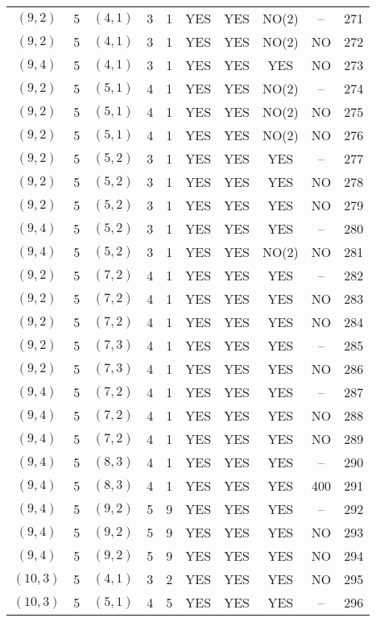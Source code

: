\begin{longtable}{|c|c|c|c|c|c|c|c|c|c|}
$(9, 2)$ & 5 & $(4, 1)$ & 3 & 1 & YES & YES & NO(2) & -- & 271\\
$(9, 2)$ & 5 & $(4, 1)$ & 3 & 1 & YES & YES & NO(2) & NO & 272\\
$(9, 4)$ & 5 & $(4, 1)$ & 3 & 1 & YES & YES & YES & NO & 273\\
$(9, 2)$ & 5 & $(5, 1)$ & 4 & 1 & YES & YES & NO(2) & -- & 274\\
$(9, 2)$ & 5 & $(5, 1)$ & 4 & 1 & YES & YES & NO(2) & NO & 275\\
$(9, 2)$ & 5 & $(5, 1)$ & 4 & 1 & YES & YES & NO(2) & NO & 276\\
$(9, 2)$ & 5 & $(5, 2)$ & 3 & 1 & YES & YES & YES & -- & 277\\
$(9, 2)$ & 5 & $(5, 2)$ & 3 & 1 & YES & YES & YES & NO & 278\\
$(9, 2)$ & 5 & $(5, 2)$ & 3 & 1 & YES & YES & YES & NO & 279\\
$(9, 4)$ & 5 & $(5, 2)$ & 3 & 1 & YES & YES & YES & -- & 280\\
$(9, 4)$ & 5 & $(5, 2)$ & 3 & 1 & YES & YES & NO(2) & NO & 281\\
$(9, 2)$ & 5 & $(7, 2)$ & 4 & 1 & YES & YES & YES & -- & 282\\
$(9, 2)$ & 5 & $(7, 2)$ & 4 & 1 & YES & YES & YES & NO & 283\\
$(9, 2)$ & 5 & $(7, 2)$ & 4 & 1 & YES & YES & YES & NO & 284\\
$(9, 2)$ & 5 & $(7, 3)$ & 4 & 1 & YES & YES & YES & -- & 285\\
$(9, 2)$ & 5 & $(7, 3)$ & 4 & 1 & YES & YES & YES & NO & 286\\
$(9, 4)$ & 5 & $(7, 2)$ & 4 & 1 & YES & YES & YES & -- & 287\\
$(9, 4)$ & 5 & $(7, 2)$ & 4 & 1 & YES & YES & YES & NO & 288\\
$(9, 4)$ & 5 & $(7, 2)$ & 4 & 1 & YES & YES & YES & NO & 289\\
$(9, 4)$ & 5 & $(8, 3)$ & 4 & 1 & YES & YES & YES & -- & 290\\
$(9, 4)$ & 5 & $(8, 3)$ & 4 & 1 & YES & YES & YES & 400 & 291\\
$(9, 4)$ & 5 & $(9, 2)$ & 5 & 9 & YES & YES & YES & -- & 292\\
$(9, 4)$ & 5 & $(9, 2)$ & 5 & 9 & YES & YES & YES & NO & 293\\
$(9, 4)$ & 5 & $(9, 2)$ & 5 & 9 & YES & YES & YES & NO & 294\\
$(10, 3)$ & 5 & $(4, 1)$ & 3 & 2 & YES & YES & YES & NO & 295\\
$(10, 3)$ & 5 & $(5, 1)$ & 4 & 5 & YES & YES & YES & -- & 296\\

\end{longtable}

